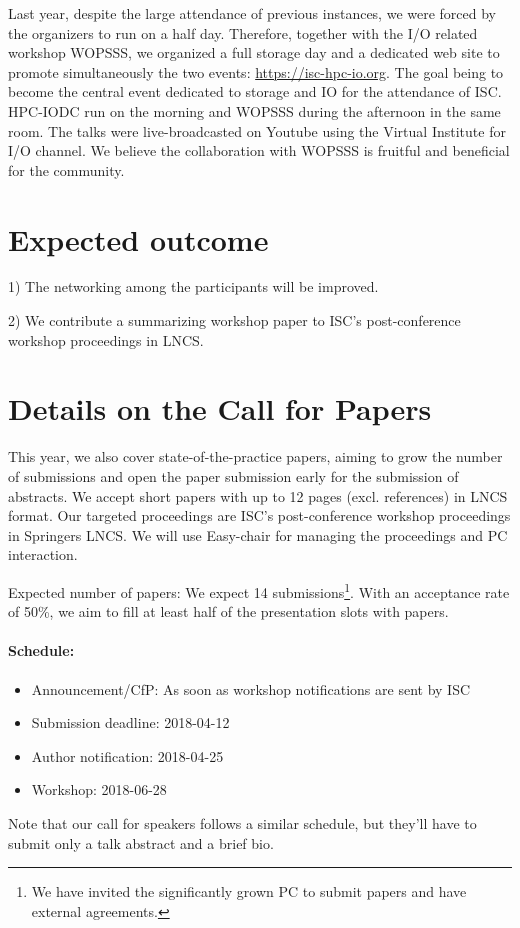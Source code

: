 \documentclass[a4paper,10pt]{article}
\begin{document}
Last year, despite the large attendance of previous instances, we were forced by the organizers to run on a half day.
Therefore, together with the I/O related workshop WOPSSS, we organized a full storage  day and a dedicated web site to promote simultaneously the two events: \url{https://isc-hpc-io.org}.
The goal being to become the central event dedicated to storage and IO for the attendance of ISC.
HPC-IODC run on the morning and WOPSSS during the afternoon in the same room.
The talks were live-broadcasted on Youtube using the Virtual Institute for I/O channel.
We believe the collaboration with WOPSSS is fruitful and beneficial for the community.

\section{Expected outcome}
1) The networking among the participants will be improved.

2) We contribute a summarizing workshop paper to ISC's post-conference workshop proceedings in LNCS.

\section{Details on the Call for Papers}

This year, we also cover state-of-the-practice papers, aiming to grow the number of submissions and open the paper submission early for the submission of abstracts.
We accept short papers with up to 12 pages (excl. references) in LNCS format.
Our targeted proceedings are ISC's post-conference workshop proceedings in Springers LNCS.
We will use Easy-chair for managing the proceedings and PC interaction.

Expected number of papers: We expect 14 submissions\footnote{We have invited the significantly grown PC to submit papers and have external agreements.}.
With an acceptance rate of 50\%, we aim to fill at least half of the presentation slots with papers.

\paragraph{Schedule:}
\begin{itemize}
  \item Announcement/CfP: As soon as workshop notifications are sent by ISC
  \item Submission deadline: 2018-04-12
  \item Author notification: 2018-04-25
  \item Workshop: 2018-06-28
\end{itemize}
Note that our call for speakers follows a similar schedule, but they'll have to submit only a talk abstract and a brief bio.
\end{document}
